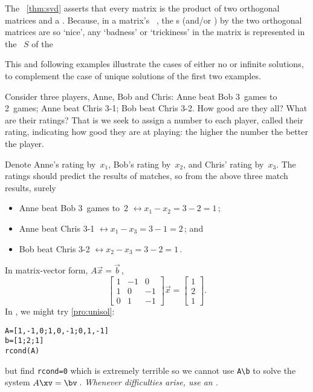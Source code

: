 The \svd\ \cref{thm:svd} asserts that every matrix is the product of two orthogonal matrices and a .  
Because, in a matrix's \svd\ , the s (and/or ) by the two orthogonal matrices are so `nice', any `badness' or `trickiness' in the matrix is represented in the ~\(S\) of the 

This and following examples illustrate the cases of either no or infinite solutions, to complement the case of unique solutions of the first two examples.

\begin{example} \label{eg:rstp}
    Consider three  players, Anne, Bob and Chris:
        Anne beat Bob 3~games to 2~games;
        Anne beat Chris 3-1;
        Bob beat Chris 3-2.
How good are they all?  What are their ratings?  
That is we seek to assign a number to each player, called their rating, indicating how good they are at playing: the higher the number the better the player. 
    
\begin{solution} 
    Denote Anne's rating by~$x_1$, Bob's rating by~$x_2$, and Chris' 
    rating by~$x_3$.    
	The ratings should predict the results of matches, so from the
	above three match results, surely
	\begin{itemize}
\item Anne beat Bob 3~games to~2 \(\leftrightarrow x_1-x_2=3-2=1\)\,;
\item Anne beat Chris 3-1 \(\leftrightarrow x_1-x_3=3-1=2\)\,; and
\item Bob beat Chris 3-2 \(\leftrightarrow x_2-x_3=3-2=1\)\,.
\end{itemize}
    In matrix-vector form, $A\vec x=\vec b$\,,
    \begin{displaymath}
        \begin{bmatrix}
            1&-1&0\\ 1&0&-1\\ 0&1&-1
        \end{bmatrix}\vec x=
        \begin{bmatrix}
            1\\ 2\\ 1
        \end{bmatrix}.
    \end{displaymath}
\setbox\ajrqrbox\hbox{}%
\marginajrbox%
In \script,  we might try \cref{pro:unisol}:
\begin{verbatim}
A=[1,-1,0;1,0,-1;0,1,-1]
b=[1;2;1]
rcond(A)
\end{verbatim}
but find \verb|rcond=0| which is extremely terrible so we cannot use \verb|A\b| to solve the system \(A\xv=\bv\)\,.
\emph{Whenever difficulties arise, use an \svd.}


\end{solution}
\end{example}

